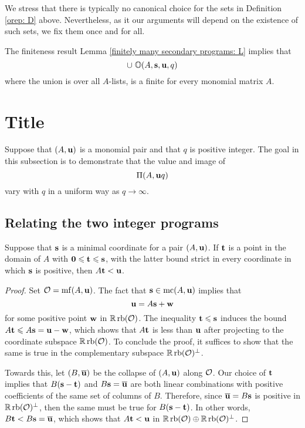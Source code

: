 \documentclass[11pt]{amsart}
\renewcommand{\!}[1]{{\color{red}\text{$\star$\,}#1\,$\star$}}
\newcommand{\ol}[1]{\overline{#1}}
\begin{document}
\begin{remark}
We stress that there is typically no canonical choice for the sets in Definition \ref{orep: D} above.  Nevertheless, as it our arguments will depend on the existence of such sets, we fix them once and for all.
\end{remark}

\begin{remark}
\label{finiteness of optimal reps: R}
The finiteness result Lemma \ref{finitely many secondary programs: L} implies that \[ \cup  \ \mathbb{O}( A, \mathbf{s}, \mathbf{u}, q ) \] where the union is over all $A$-lists, is a finite for every monomial matrix $A$.
\end{remark}

\newpage
\section{Title}
\label{solving: S}

Suppose that $(A, \mathbf{u})$ is a monomial pair and that $q$ is positive integer. The goal in this subsection is to demonstrate that the value and image of \[ \Pi(A, \mathbf{u}q) \] vary with $q$ in a uniform way as $q \to \infty$.

\subsection{Relating the two integer programs}
\label{relating-programs: ss}

\begin{lemma}
\label{less than u: L}  Suppose that $\mathbf{s}$ is a minimal coordinate for a pair $(A, \mathbf{u})$.  If $\mathbf{t}$ is a point in the domain of $A$ with $\mathbf{0} \leqslant \mathbf{t} \leqslant \mathbf{s}$, with the latter bound strict in every coordinate in which $\mathbf{s}$ is positive, then $A \mathbf{t} < \mathbf{u}$.
\end{lemma}

\begin{proof}  Set $\mathcal{O} = \operatorname{mf}(A, \mathbf{u})$.  The fact that $\mathbf{s} \in \operatorname{mc}(A, \mathbf{u})$  implies that \[ \mathbf{u} = A \mathbf{s} + \mathbf{w}\] for some positive point $\mathbf{w}$ in $\mathbb{R} \operatorname{rb}(\mathcal{O})$.     The inequality $\mathbf{t} \leqslant \mathbf{s}$ induces the bound $A \mathbf{t} \leqslant A \mathbf{s} = \mathbf{u} - \mathbf{w}$, which shows that $A\mathbf{t}$ is less than $\mathbf{u}$ after projecting to the coordinate subspace $\mathbb{R} \operatorname{rb}(\mathcal{O})$.  To conclude the proof, it suffices to show that the same is true in the complementary subspace $\mathbb{R} \operatorname{rb}(\mathcal{O})^{\perp}$.  

Towards this, let $(B,\ol{\vv{u}})$ be the collapse of $(A,\mathbf{u})$ along $\mathcal{O}$.  Our choice of $\mathbf{t}$ implies that $B( \mathbf{s} - \mathbf{t})$ and $B \vv{s} = \ol{\vv{u}}$ are both linear combinations with positive coefficients of the same set of columns of $B$.  Therefore, since $\ol{\vv{u}} = B \vv{s}$ is positive in $\mathbb{R} \operatorname{rb}(\mathcal{O})^{\perp}$, then the same must be true for $B(\mathbf{s} - \mathbf{t})$.  In other words, $B \vv{t} < B \vv{s} = \ol{\vv{u}}$, which shows that $A \mathbf{t} < \mathbf{u}$ in $\mathbb{R} \operatorname{rb}(\mathcal{O}) \oplus \mathbb{R} \operatorname{rb}(\mathcal{O})^{\perp}$.
\end{proof}
\end{document}
